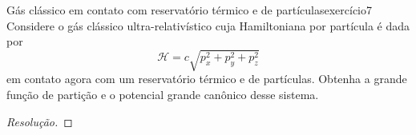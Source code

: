 \begin{exercício}{Gás clássico em contato com reservatório térmico e de partículas}{exercício7}
    Considere o gás clássico ultra-relativístico cuja Hamiltoniana por partícula é dada por
    \begin{equation*}
        \mathcal{H} = c\sqrt{p_x^2 + p_y^2 + p_z^2}
    \end{equation*}
    em contato agora com um reservatório térmico e de partículas. Obtenha a grande função de partição e o potencial grande canônico desse sistema.
\end{exercício}
\begin{proof}[Resolução]

\end{proof}
